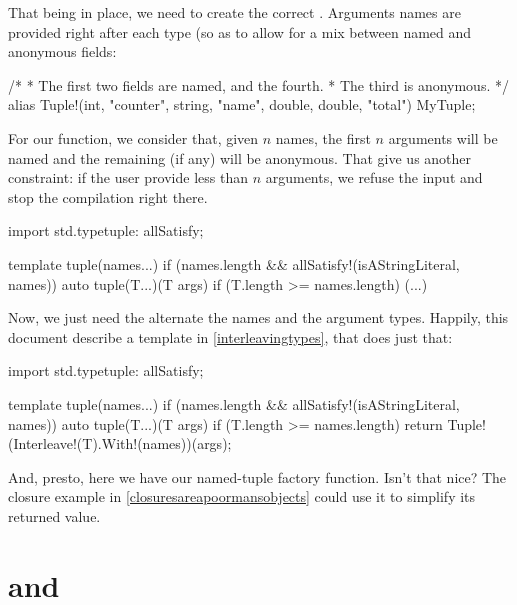 That being in place, we need to create the correct . Arguments names are provided right after each type (so as to allow for a mix between named and anonymous fields:

\begin{dcode}
/*
 * The first two fields are named, and the fourth.
 * The third is anonymous.
 */
alias Tuple!(int, "counter", string, "name", double, double, "total") MyTuple;
\end{dcode}

For our function, we consider that, given $n$ names, the first $n$ arguments will be named and the remaining (if any) will be anonymous. That give us another constraint: if the user provide less than $n$ arguments, we refuse the input and stop the compilation right there.

\begin{dcode}
import std.typetuple: allSatisfy;

template tuple(names...) 
if (names.length && allSatisfy!(isAStringLiteral, names))
{
    auto tuple(T...)(T args) if (T.length >= names.length)
    {
    (...)
    }
}
\end{dcode}

Now, we just need the alternate the names and the argument types. Happily, this document describe a  template in \ref{interleavingtypes}, that does just that:

\begin{dcode}
import std.typetuple: allSatisfy;

template tuple(names...) 
if (names.length && allSatisfy!(isAStringLiteral, names))
{
    auto tuple(T...)(T args) if (T.length >= names.length)
    {
        return Tuple!(Interleave!(T).With!(names))(args);
    }
}
\end{dcode}

And, presto, here we have our named-tuple factory function. Isn't that nice? The closure example in \ref{closuresareapoormansobjects} could use it to simplify its returned value.


\section{\texorpdfstring{ and }
                        {\_\_FILE\_\_ and \_\_LINE\_\_}}
\label{fileandline}


